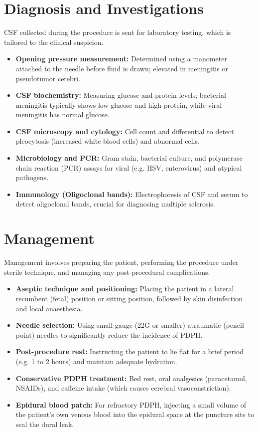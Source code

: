 \section*{Diagnosis and Investigations}
CSF collected during the procedure is sent for laboratory testing, which is tailored to the clinical suspicion.
\begin{itemize}
    \item \textbf{Opening pressure measurement:} Determined using a manometer attached to the needle before fluid is drawn; elevated in meningitis or pseudotumor cerebri.
    \item \textbf{CSF biochemistry:} Measuring glucose and protein levels; bacterial meningitis typically shows low glucose and high protein, while viral meningitis has normal glucose.
    \item \textbf{CSF microscopy and cytology:} Cell count and differential to detect pleocytosis (increased white blood cells) and abnormal cells.
    \item \textbf{Microbiology and PCR:} Gram stain, bacterial culture, and polymerase chain reaction (PCR) assays for viral (e.g. HSV, enterovirus) and atypical pathogens.
    \item \textbf{Immunology (Oligoclonal bands):} Electrophoresis of CSF and serum to detect oligoclonal bands, crucial for diagnosing multiple sclerosis.
\end{itemize}

\section*{Management}
Management involves preparing the patient, performing the procedure under sterile technique, and managing any post-procedural complications.
\begin{itemize}
    \item \textbf{Aseptic technique and positioning:} Placing the patient in a lateral recumbent (fetal) position or sitting position, followed by skin disinfection and local anaesthesia.
    \item \textbf{Needle selection:} Using small-gauge (22G or smaller) atraumatic (pencil-point) needles to significantly reduce the incidence of PDPH.
    \item \textbf{Post-procedure rest:} Instructing the patient to lie flat for a brief period (e.g. 1 to 2 hours) and maintain adequate hydration.
    \item \textbf{Conservative PDPH treatment:} Bed rest, oral analgesics (paracetamol, NSAIDs), and caffeine intake (which causes cerebral vasoconstriction).
    \item \textbf{Epidural blood patch:} For refractory PDPH, injecting a small volume of the patient's own venous blood into the epidural space at the puncture site to seal the dural leak.
\end{itemize}

